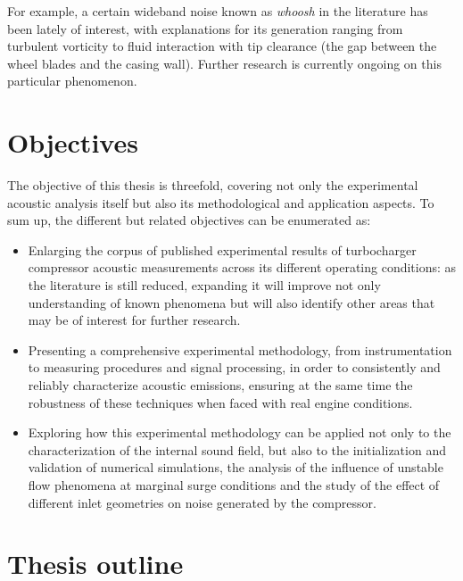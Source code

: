 For example, a certain wideband noise known as \emph{whoosh} in the literature has been lately of interest, with explanations for its generation ranging from turbulent vorticity to fluid interaction with tip clearance (the gap between the wheel blades and the casing wall). Further research is currently ongoing on this particular phenomenon.


\section{Objectives}

The objective of this thesis is threefold, covering not only the experimental acoustic analysis itself but also its methodological and application aspects. To sum up, the different but related objectives can be enumerated as:

\begin{itemize}
	\item Enlarging the corpus of published experimental results of turbocharger compressor acoustic measurements across its different operating conditions: as the literature is still reduced, expanding it will improve not only understanding of known phenomena but will also identify other areas that may be of interest for further research.

	\item Presenting a comprehensive experimental methodology, from instrumentation to measuring procedures and signal processing, in order to consistently and reliably characterize acoustic emissions, ensuring at the same time the robustness of these techniques when faced with real engine conditions.

	\item Exploring how this experimental methodology can be applied not only to the characterization of the internal sound field, but also to the initialization and validation of numerical simulations, the analysis of the influence of unstable flow phenomena at marginal surge conditions and the study of the effect of different inlet geometries on noise generated by the compressor.
\end{itemize}

\section{Thesis outline}

